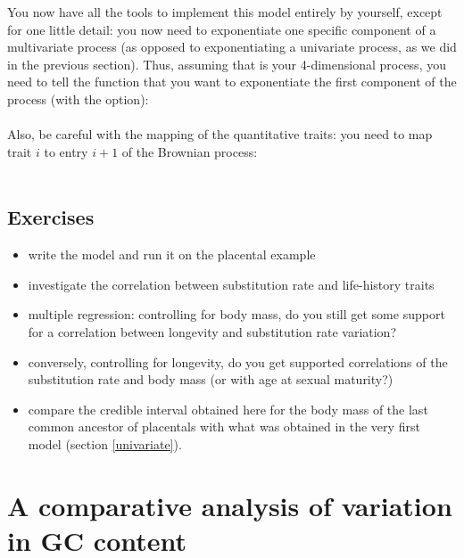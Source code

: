 You now have all the tools to implement this model entirely by yourself, except for one little detail: you now need to exponentiate one specific component of a multivariate process (as opposed to exponentiating a univariate process, as we did in the previous section). Thus, assuming that  is your 4-dimensional process, you need to tell the  function that you want to exponentiate the first component of the process (with the  option):
\\
\\
Also, be careful with the mapping of the quantitative traits: you need to map trait $i$ to entry $i+1$ of the Brownian process:
\\
\\



\subsection{Exercises}

\begin{itemize}
\item
write the model and run it on the placental example
\item
investigate the correlation between substitution rate and life-history traits
\item
multiple regression: controlling for body mass, do you still get some support for a correlation between longevity and substitution rate variation?
\item
conversely, controlling for longevity, do you get supported correlations of the substitution rate and body mass (or with age at sexual maturity?)
\item
compare the credible interval obtained here for the body mass of the last common ancestor of placentals with what was obtained in the very first model (section \ref{univariate}).
\end{itemize}

\section{A comparative analysis of variation in GC content}

